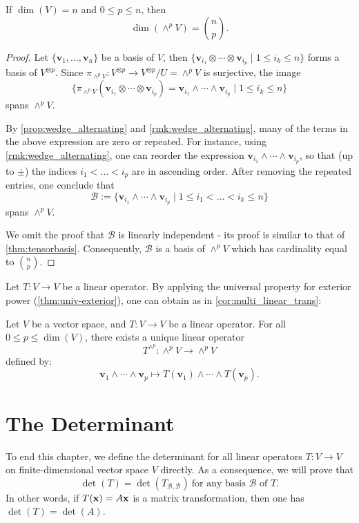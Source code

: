 \begin{proposition}
If $\dim(V) = n$ and $0 \leq p \leq n$, then
\[
\dim(\wedge^p V) = \binom{n}{p}.
\]
\end{proposition}
\begin{proof} 
Let $\{\mathbf{v}_1, \dots, \mathbf{v}_n\}$ be a basis of $V$, then $\{ \mathbf{v}_{i_1} \otimes \cdots \otimes \mathbf{v}_{i_p} \mid 1 \leq i_k \leq n\}$ forms a basis of $V^{\otimes p}$. Since $\pi_{\wedge^p V} : V^{\otimes p} \to V^{\otimes p}/U = \wedge^p V$ is surjective, the image 
\[ 
\{ \pi_{\wedge^pV}(\mathbf{v}_{i_1} \otimes \cdots \otimes \mathbf{v}_{i_p}) = \mathbf{v}_{i_1} \wedge \cdots \wedge \mathbf{v}_{i_p} \mid 1 \leq i_k\leq n \}
\]
spans $\wedge^p V$.
    
By \autoref{prop:wedge_alternating} and \autoref{rmk:wedge_alternating}, many of the terms in the above expression are zero or repeated. For instance, using \autoref{rmk:wedge_alternating}, one can reorder the expression $\mathbf{v}_{i_1} \wedge \cdots \wedge \mathbf{v}_{i_p}$, so that (up to $\pm$) the indices
$i_1 < \dots < i_p$ are in ascending order. 
After removing the repeated entries, one conclude that
$$\mathcal{B} := \{ \mathbf{v}_{i_1} \wedge \cdots \wedge \mathbf{v}_{i_p} \mid 1 \leq i_1 < \dots < i_k \leq n\}$$
spans $\wedge^pV.$

We omit the proof that $\mathcal{B}$ is linearly independent - its proof is similar to that of \autoref{thm:tensorbasis}. Consequently, $\mathcal{B}$ is a basis of $\wedge^pV$ which has cardinality equal to $\binom{n}{p}$.
\end{proof}

Let $T: V \to V$ be a linear operator. By applying the universal property for exterior power (\autoref{thm:univ-exterior}), one can obtain as in \autoref{cor:multi_linear_trans}:
\begin{corollary} \label{cor:exterior_transformation}
Let $V$ be a vector space, and $T:V \to V$ be a linear operator. For all $0 \leq p \leq \dim(V)$, there exists a unique linear operator
  \[
  T^{\wedge^p} : \wedge^p V \to \wedge^p V
  \]
defined by:
  \[
  \mathbf{v}_1 \wedge \cdots \wedge \mathbf{v}_p \mapsto T(\mathbf{v}_1) \wedge \cdots \wedge T(\mathbf{v}_p).
  \]
\end{corollary}



\section{The Determinant}
To end this chapter, we define the determinant for all linear operators $T:V \to V$ on finite-dimensional vector space $V$ directly. As a consequence, we will prove that
\[
\det(T) = \det \left( T_{\mathcal{B}, \mathcal{B}} \right) \ \text{for any basis } \mathcal{B} \text{ of } T.
\]
In other words, if $T({\bf x}) = A{\bf x}$ is a matrix transformation, then one has $\det(T) = \det(A)$.

